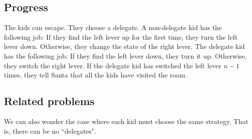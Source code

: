 \subsection{Progress}

The kids can escape. They choose a delegate. A non-delegate kid has the following job: If they find the left lever up for the first time, they turn the left lever down. Otherwise, they change the state of the right lever. The delegate kid has the following job: If they find the left lever down, they turn it up. Otherwise, they switch the right lever. If the delegate kid has switched the left lever $n-1$ times, they tell Santa that all the kids have visited the room.

\subsection{Related problems}

We can also wonder the case where each kid must choose the same strategy. That is, there can be no ``delegates".

